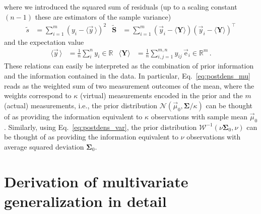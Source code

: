 \documentclass{article}
\begin{document}
where we introduced the squared sum of residuals (up to a scaling constant $(n-1)$ these are estimators of the sample variance)
\begin{align}
    \tilde{s} &= \sum\limits_{i=1}^m (y_i - \langle \vec{y}\, \rangle)^2 &
    \bm{\tilde{S}} &= \sum\limits_{i=1}^m \left( \vec{y}_i - \langle \bm{Y} \rangle \right) \left( \vec{y}_i - \langle \bm{Y} \rangle \right)^\top
\end{align}
and the expectation value
\begin{align}
    \langle \vec{y} \, \rangle &= \frac{1}{n} \sum\limits_{i}^n y_i \in \mathbb{R} &
    \langle \bm{Y} \rangle &= \frac{1}{n} \sum\limits_{i,j=1}^{m,n} y_{ij} \, \vec{\mathrm{e}}_i \in \mathbb{R}^m \,.
\end{align}
These relations can easily be interpreted as the combination of prior information and the information contained in the data.
In particular, Eq.~\eqref{eq:postdens_mu} reads as the weighted sum of two measurement outcomes of the mean, where the weights correspond to $\kappa$ (virtual) measurements encoded in the prior and the $m$ (actual) measurements, i.e., the prior distribution $\mathcal{N}(\vec{\mu}_0, \bm{\Sigma} / \kappa)$ can be thought of as providing the information equivalent to $\kappa$ observations with sample mean $\vec{\mu}_0$.
Similarly, using Eq.~\eqref{eq:postdens_var}, the prior distribution $\mathcal{W}^{-1}(\nu \bm{\Sigma}_0, \nu)$ can be thought of as providing the information equivalent to $\nu$ observations with average squared deviation $\bm{\Sigma}_0$.

\newpage
\section{Derivation of multivariate generalization in detail}
\end{document}
